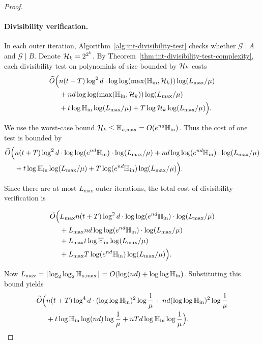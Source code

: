 \documentclass{article}
\numberwithin{equation}{section}
\begin{document}
\begin{proof}
\paragraph{Divisibility verification.}
 In each outer iteration, Algorithm~\ref{alg:int-divisibility-test} checks whether $\mathcal{G} \mid A$ and $\mathcal{G} \mid B$. Denote ${\mathcal{H}}_k = 2^{2^k}$.
%
By Theorem~\ref{thm:int-divisibility-test-complexity}, each divisibility test on polynomials of size bounded by ${\mathcal{H}}_k$ costs
\[
\begin{aligned}
\widetilde{O}\Bigl(
& n (t+T) \log^2 d \cdot \log\log(\max(\mathbb{H}_{\rm in},{\mathcal{H}}_k)) \log(L_{\max}/\mu) \\
&+ n d \log\log(\max(\mathbb{H}_{\rm in},{\mathcal{H}}_k)) \log(L_{\max}/\mu) \\
&+ t\log\mathbb{H}_{\rm in} \log(L_{\max}/\mu) 
+ T\log{\mathcal{H}}_k \log(L_{\max}/\mu) 
\Bigr).
\end{aligned}
\]


We use the worst-case bound ${\mathcal{H}}_k \le \mathbb{H}_{o,\max} = O(e^{nd}\mathbb{H}_{\rm in})$. Thus the cost of one test is bounded by
\[
\begin{aligned}
\widetilde{O}\Bigl(
& n (t+T) \log^2 d \cdot \log\log(e^{nd}\mathbb{H}_{\rm in}) \cdot \log(L_{\max}/\mu)
+ n d \log\log(e^{nd}\mathbb{H}_{\rm in}) \cdot \log(L_{\max}/\mu) \\
&+ t\log\mathbb{H}_{\rm in} \log(L_{\max}/\mu)
+ T\log(e^{nd}\mathbb{H}_{\rm in}) \log(L_{\max}/\mu)
\Bigr).
\end{aligned}
\]



Since there are at most $L_{\max}$ outer iterations, the total cost of divisibility verification is

\[
\begin{aligned}
\widetilde{O}\Bigl(
& L_{\max} n (t+T) \log^2 d \cdot \log\log(e^{nd}\mathbb{H}_{\rm in}) \cdot \log(L_{\max}/\mu) \\
&+ L_{\max} n d \log\log(e^{nd}\mathbb{H}_{\rm in}) \cdot \log(L_{\max}/\mu) \\
&+ L_{\max} t\log\mathbb{H}_{\rm in} \log(L_{\max}/\mu) \\
&+ L_{\max} T\log(e^{nd}\mathbb{H}_{\rm in}) \log(L_{\max}/\mu) 
\Bigr).
\end{aligned}
\]


Now $L_{\max} = \lceil \log_2 \log_2 \mathbb{H}_{o,\max} \rceil = O(\log(nd) + \log\log\mathbb{H}_{\rm in})$. Substituting this bound yields
\[
\begin{aligned}
\widetilde{O}\Bigl(
& n (t+T) \log^4 d \cdot (\log\log\mathbb{H}_{\rm in})^2 \log\frac{1}{\mu}
+ n d (\log\log\mathbb{H}_{\rm in})^2 \log\frac{1}{\mu} \\
&+ t\log\mathbb{H}_{\rm in} \log(nd) \log\frac{1}{\mu}
+ nTd\log\mathbb{H}_{\rm in} \log\frac{1}{\mu}
\Bigr).
\end{aligned}
\]




\end{proof}
\end{document}
